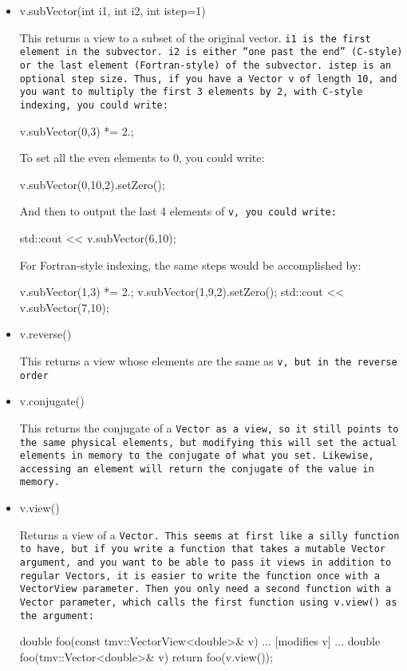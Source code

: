 \begin{itemize}
\item
\begin{tmvcode}
v.subVector(int i1, int i2, int istep=1)
\end{tmvcode}
This returns a view to a subset of the original vector.
\tt{i1} is the first element in the subvector.
\tt{i2} is either ``one past the end'' (C-style) or the last element
(Fortran-style) of the subvector.
\tt{istep} is an optional step size.
Thus, if you have a \tt{Vector~v} of length 10, and you want to
multiply the first 3 elements by 2, with C-style indexing, you could write:
\begin{tmvcode}
v.subVector(0,3) *= 2.;
\end{tmvcode}
To set all the even elements to 0, you could write:
\begin{tmvcode}
v.subVector(0,10,2).setZero();
\end{tmvcode}
And then to output the last 4 elements of \tt{v}, you could write:
\begin{tmvcode}
std::cout << v.subVector(6,10);
\end{tmvcode}

For Fortran-style indexing, the same steps would be accomplished by:
\begin{tmvcode}
v.subVector(1,3) *= 2.;
v.subVector(1,9,2).setZero();
std::cout << v.subVector(7,10);
\end{tmvcode}

\item
\begin{tmvcode}
v.reverse()
\end{tmvcode}
This returns a view whose elements are the same as \tt{v},
but in the reverse order

\item
\begin{tmvcode}
v.conjugate()
\end{tmvcode}
This returns the conjugate of a \tt{Vector} as a view, so it still points
to the same physical elements, but modifying this will set the 
actual elements in memory to the conjugate of what you set.  Likewise,
accessing an element will return the conjugate of the value in memory.

\item
\begin{tmvcode}
v.view()
\end{tmvcode}
Returns a view of a \tt{Vector}.  This seems at first like a silly function to have, but
if you write a function that takes a mutable \tt{Vector} argument, and you want to
be able to pass it views in addition to regular \tt{Vector}s, it is easier to write the 
function once with a \tt{VectorView} parameter.  Then you only need a second 
function with a \tt{Vector} parameter, which calls the first function
using \tt{v.view()} as the argument:
\begin{tmvcode}
double foo(const tmv::VectorView<double>& v)
{ ... [modifies v] ... }
double foo(tmv::Vector<double>& v)
{ return foo(v.view()); }
\end{tmvcode}


\end{itemize}
